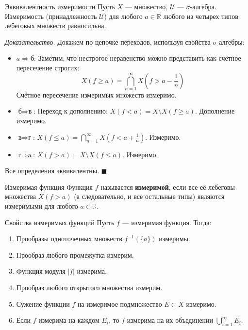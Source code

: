 \documentclass[12pt,a4paper]{article}
\newenvironment{Proof}[1][Доказательство]{\vspace{0.5em}\noindent\textit{#1.}\hspace{0.5em}\ignorespaces}{\hfill$\blacksquare$\vspace{1em}}
\begin{document}
\begin{center}
\begin{Lemma}{Эквивалентность измеримости}{}
Пусть $X$ — множество, $\mathcal{U}$ — $\sigma$-алгебра. Измеримость (принадлежность $\mathcal{U}$) для любого $a \in \mathbb{R}$ любого из четырех типов лебеговых множеств равносильна.
\end{Lemma}

\begin{Proof}
Докажем по цепочке переходов, используя свойства $\sigma$-алгебры:
\begin{itemize}
    \item $a \Rightarrow \text{б}$: Заметим, что нестрогое неравенство можно представить как счётное пересечение строгих:
    $$ X(f \ge a) = \bigcap\limits_{n=1}^{\infty} X\left(f > a - \frac{1}{n}\right) $$
    Счётное пересечение измеримых множеств измеримо.
    \item $\text{б} \Rightarrow \text{в}$: Переход к дополнению: $X(f < a) = X \setminus X(f \ge a)$. Дополнение измеримо.
    \item $\text{в} \Rightarrow \text{г}$: $X(f \le a) = \bigcap\limits_{n=1}^{\infty} X\left(f < a + \frac{1}{n}\right)$. Измеримо.
    \item $\text{г} \Rightarrow \text{a}$: $X(f > a) = X \setminus X(f \le a)$. Измеримо.
\end{itemize}
Все определения эквивалентны.
\end{Proof}

\begin{Definition}{Измеримая функция}{}
Функция $f$ называется \textbf{измеримой}, если все её лебеговы множества $X(f > a)$ (а следовательно, и все остальные типы) являются измеримыми для любого $a \in \mathbb{R}$.
\end{Definition}

\begin{Lemma}{Свойства измеримых функций}{}
Пусть $f$ — измеримая функция. Тогда:
\begin{enumerate}
    \item Прообразы одноточечных множеств $f^{-1}(\{a\})$ измеримы.
    \item Прообраз любого промежутка измерим.
    \item Функция модуля $|f|$ измерима.
    \item Прообраз любого открытого множества измерим.
    \item Сужение функции $f$ на измеримое подмножество $E \subset X$ измеримо.
    \item Если $f$ измерима на каждом $E_i$, то $f$ измерима на их объединении $\bigcup\limits_{i=1}^{\infty} E_i$.
\end{enumerate}
\end{Lemma}
\end{center}
\end{document}
